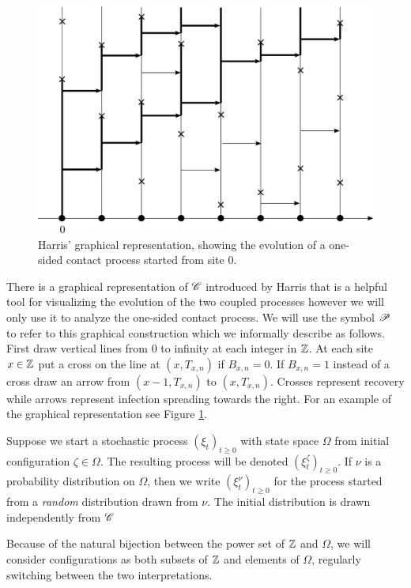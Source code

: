 \begin{figure}[!h]
  \includegraphics[width=\linewidth]{graphical_construction}
  \caption{Harris' graphical representation, showing the evolution of a one-sided contact process started from site $0$. }
  \label{fig:graphical_construction}
\end{figure}

There is a graphical representation of $\mathscr{C}$ introduced by Harris that is a helpful tool for visualizing the evolution of the two coupled processes however we will only use it to analyze the one-sided contact process. We will use the symbol $\mathscr{P}$ to refer to this graphical construction which we informally describe as follows. First draw vertical lines from $0$ to infinity at each integer in $\mathbb{Z}$. At each site $x \in \mathbb{Z}$ put a cross on the line at $(x, T_{x,n})$ if $B_{x,n} = 0$. If $B_{x,n} = 1$ instead of a cross draw an arrow from $(x - 1, T_{x,n})$ to $(x, T_{x,n})$. Crosses represent recovery while arrows represent infection spreading towards the right. For an example of the graphical representation see Figure \ref{fig:graphical_construction}. 

\begin{notation}
Suppose we start a stochastic process $(\xi_t)_{t \geq 0}$ with state space $\Omega$ from initial configuration $\zeta \in \Omega$. The resulting process will be denoted $(\xi^\zeta_t)_{t \geq 0}$. If $\nu$ is a probability distribution on $\Omega$, then we write $(\xi^\nu_t)_{t \geq 0}$ for the process started from a \textit{random} distribution drawn from $\nu$. The initial distribution is drawn independently from $\mathscr{C}$
\end{notation}
\begin{notation}\label{not:powerset}
Because of the natural bijection between the power set of $\mathbb{Z}$ and $\Omega$, we will consider configurations as both subsets of $\mathbb{Z}$ and elements of $\Omega$, regularly switching between the two interpretations. 
\end{notation}

